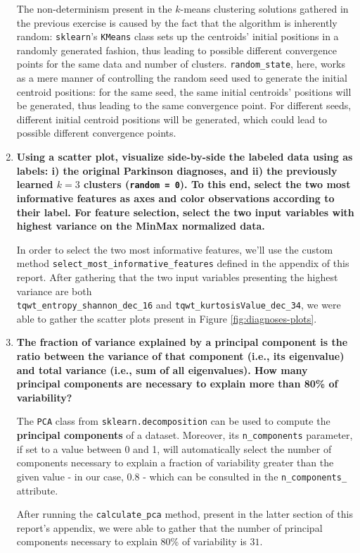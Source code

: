\documentclass[12pt]{article}
\begin{document}
\begin{enumerate}[leftmargin=\labelsep,resume]
        The non-determinism present in the $k$-means clustering solutions gathered
        in the previous exercise is caused by the fact that the algorithm is
        inherently random: \texttt{sklearn}'s \texttt{KMeans} class sets up
        the centroids' initial positions in a randomly generated fashion,
        thus leading to possible different convergence points for the same
        data and number of clusters. \texttt{random\_state}, here, works
        as a mere manner of controlling the random seed used to generate
        the initial centroid positions: for the same seed, the same
        initial centroids' positions will be generated, thus leading to
        the same convergence point. For different seeds, different
        initial centroid positions will be generated, which could lead
        to possible different convergence points.

        \pagebreak

  \item \textbf{Using a scatter plot, visualize side-by-side the labeled data using as labels: i) the original
          Parkinson diagnoses, and ii) the previously learned $k = 3$ clusters (\texttt{random = 0}). To this end, select
          the two most informative features as axes and color observations according to their label. For feature
          selection, select the two input variables with highest variance on the MinMax normalized data.}

        In order to select the two most informative features, we'll use the
        custom method \texttt{select\_most\_informative\_features} defined in
        the appendix of this report. After gathering that the two
        input variables presenting the highest variance are both \\
        \texttt{tqwt\_entropy\_shannon\_dec\_16} and
        \texttt{tqwt\_kurtosisValue\_dec\_34}, we were able to gather the
        scatter plots present in Figure \ref{fig:diagnoses-plots}.

  \item \textbf{The fraction of variance explained by a principal component is the ratio between the
          variance of that component (i.e., its eigenvalue) and total variance (i.e., sum of all eigenvalues).
          How many principal components are necessary to explain more than 80\% of variability?}

        The \texttt{PCA} class from \texttt{sklearn.decomposition} can be used to
        compute the \textbf{principal components} of a dataset. Moreover, its
        \texttt{n\_components} parameter, if set to a value between 0 and 1, will
        automatically select the number of components necessary to explain a fraction
        of variability greater than the given value - in our case, 0.8 - which can
        be consulted in the \texttt{n\_components\_} attribute.

        After running the \texttt{calculate\_pca} method, present in the latter
        section of this report's appendix, we were able to gather that the
        number of principal components necessary to explain 80\% of variability
        is $31$.

\end{enumerate}
\end{document}
